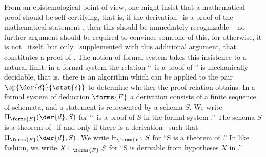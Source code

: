 From an epistemological point of view, one might insist that a mathematical proof should be self-certifying, that is, if the derivation \ is a proof of the mathematical statement , then this should be immediately recognizable -- no further argument should be required to convince someone of this, for otherwise, it is not \ itself, but only \ supplemented with this additional argument, that constitutes a proof of . The notion of formal system takes this insistence to a natural limit: in a formal system the relation ``\ is a proof of '' is mechanically decidable, that is, there is an algorithm which can be applied to the pair $\op{\der{d}}{\stat{s}}$ to determine whether the proof relation obtains. In a formal system of deduction $\forms{F}$ a derivation  consists of a finite sequence of schemata, and a statement  is represented by a schema $S$. We write $\Pi_{\forms{F}}(\der{d},S)$ for ``\ is a proof of $S$ in the formal system .'' The schema $S$ is a theorem of \ if and only if there is a derivation \ such that $\Pi_{\forms{F}}(\der{d},S)$. We write $\vdash_{\forms{F}}S$ for ``S is a theorem of .'' In like fashion, we write $X\vdash_{\forms{F}}S$ for ``S is derivable from hypotheses $X$ in .''


